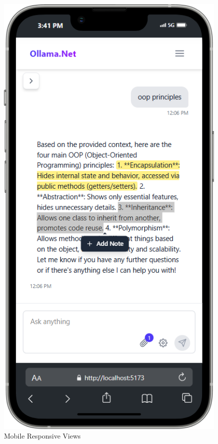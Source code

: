 \begin{figure}[p]
    \centering
    \includegraphics[width=\textwidth,height=0.8\textheight,keepaspectratio]{./Chapter07/figures/mobile_responsive_views.png}
    \caption{Mobile Responsive Views}
    \label{fig:mobile-responsive-views}
\end{figure}
\clearpage

